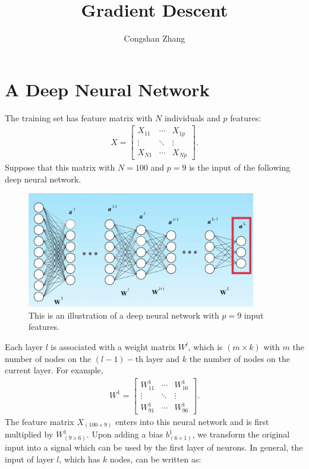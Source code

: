 \documentclass[letterpaper,12pt]{article}
\begin{document}
 
	\title{Gradient Descent}
	\author{Congshan Zhang}
	\date{}
	\maketitle
\section{A Deep Neural Network}
The training set has feature matrix with $N$ individuals and $p$ features:
\begin{align}
X=\begin{bmatrix} 
X_{11} & \cdots & X_{1p} \\
\vdots & \ddots & \vdots\\
X_{N1} & \cdots & X_{Np}
\end{bmatrix}.
\end{align}
Suppose that this matrix with $N=100$ and $p=9$ is the input of the following deep neural network.
\begin{figure}[H]
	\begin{center}
		\includegraphics[width=10cm,clip]{nn.png}
	\end{center}
	\caption{This is an illustration of a deep neural network with $p=9$ input features.}\label{fig:1}
\end{figure}
Each layer $l$ is associated with a weight matrix $W^l$, which is $(m\times k)$ with $m$ the number of nodes on the $(l-1)-$th layer and $k$ the number of nodes on the current layer. For example, 
\begin{align}
W^1=\begin{bmatrix} 
W_{11}^1 & \cdots & W_{16}^1 \\
\vdots & \ddots & \vdots\\
W_{91}^1 & \cdots & W_{96}^1
\end{bmatrix}.
\end{align}
The feature matrix $X_{(100\times 9)}$ enters into this neural network and is first multiplied by $W^1_{(9\times 6)}$. Upon adding a bias $b^1_{(6\times 1)}$, we transform the original input into a signal which can be used by the first layer of neurons. In general, the input of layer $l$, which has $k$ nodes, can be written as:
\end{document}
